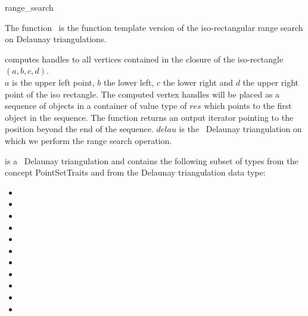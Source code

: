 \begin{ccRefFunction}{range_search}

\ccDefinition  

The function \ccRefName\ is the function template version of the iso-rectangular range search on Delaunay
triangulations.


{computes handles to all vertices contained in the closure of the iso-rectangle $(a,b,c,d)$.\\
\ccPrecond $a$ is the upper left point, $b$ the lower left, $c$ the lower
right and $d$ the upper right point of the iso rectangle.
The computed vertex handles will be placed as a sequence of objects in a container of value type
of $res$
which points to the first object in the sequence. The function
returns an output iterator pointing to the position beyond the end
of the sequence. $delau$ is the \cgal\ Delaunay triangulation on which we perform the range search operation.} 

 is a \cgal\ Delaunay triangulation and contains the following subset of types from the concept PointSetTraits and from
the Delaunay triangulation data type:
\begin{itemize}
  \item {} 
  \item {}
  \item {} 
  \item {}   
  \item {} 
  \item {}  
  \item {}  
  \item {} 
  \item {} 
  \item {} 
  \item {}  
\end{itemize}

\end{ccRefFunction}
